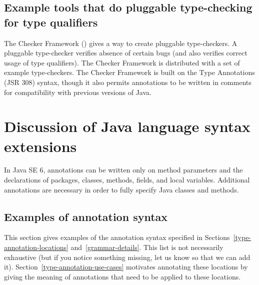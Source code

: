 \documentclass[10pt]{article}
\begin{document}
\subsection{Example tools that do pluggable type-checking for type qualifiers\label{type-qualifier-examples}}

The Checker Framework
()
gives a way to create pluggable type-checkers.  A pluggable type-checker
verifies absence of certain bugs (and also verifies correct usage of type
qualifiers).  The Checker Framework is distributed with a set of example
type-checkers.  The Checker Framework is built on the Type Annotations (JSR
308) syntax, though it also permits annotations to be written in comments
for compatibility with previous versions of Java.



\section{Discussion of Java language syntax extensions\label{syntax-discussion}}

In Java SE 6, annotations can be written only on method parameters
and the declarations of packages, classes, methods, fields, and local variables.
Additional annotations are necessary in order to fully specify Java classes and
methods.


\subsection{Examples of annotation syntax\label{type-annotation-syntax-examples}}

This section gives examples of the annotation syntax specified in
Sections~\ref{type-annotation-locations} and~\ref{grammar-details}.
This list is not necessarily exhaustive (but if you notice something
missing, let us know so that we can add it).
Section~\ref{type-annotation-use-cases} motivates annotating these
locations by giving the meaning of annotations that need to be applied to
these locations.


\newcommand{\preverbnegspace}{\vspace{-5pt}}

\end{document}
